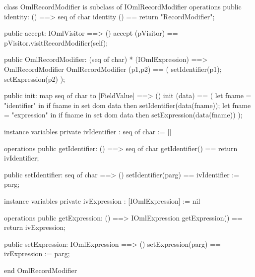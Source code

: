 \begin{vdm_al}
class OmlRecordModifier is subclass of IOmlRecordModifier
operations
  public identity: () ==> seq of char
  identity () == return "RecordModifier";

  public accept: IOmlVisitor ==> ()
  accept (pVisitor) == pVisitor.visitRecordModifier(self);

  public OmlRecordModifier:
      (seq of char) *
      (IOmlExpression) ==> OmlRecordModifier
  OmlRecordModifier (p1,p2) == 
   ( setIdentifier(p1);
     setExpression(p2) );

  public init: map seq of char to [FieldValue] ==> ()
  init (data) ==
    ( let fname = "identifier" in
        if fname in set dom data
        then setIdentifier(data(fname));
      let fname = "expression" in
        if fname in set dom data
        then setExpression(data(fname)) );

instance variables
  private ivIdentifier : seq of char := []

operations
  public getIdentifier: () ==> seq of char
  getIdentifier() == return ivIdentifier;

  public setIdentifier: seq of char ==> ()
  setIdentifier(parg) == ivIdentifier := parg;

instance variables
  private ivExpression : [IOmlExpression] := nil

operations
  public getExpression: () ==> IOmlExpression
  getExpression() == return ivExpression;

  public setExpression: IOmlExpression ==> ()
  setExpression(parg) == ivExpression := parg;

end OmlRecordModifier
\end{vdm_al}


